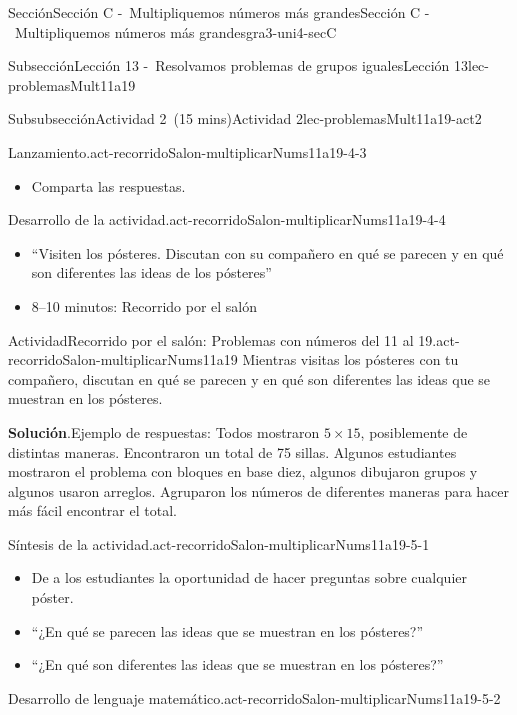 \documentclass[oneside,10pt,]{article}
\newcommand{\blocktitlefont}{\relax}
\begin{document}
\begin{sectionptx}{Sección}{Sección C -~Multipliquemos números más grandes}{}{Sección C -~Multipliquemos números más grandes}{}{}{gra3-uni4-secC}
\begin{subsectionptx}{Subsección}{Lección 13 -~Resolvamos problemas de grupos iguales}{}{Lección 13}{}{}{lec-problemasMult11a19}
\begin{subsubsectionptx}{Subsubsección}{Actividad 2~(15 mins)}{}{Actividad 2}{}{}{lec-problemasMult11a19-act2}
\begin{paragraphs}{Lanzamiento.}{act-recorridoSalon-multiplicarNums11a19-4-3}
\begin{itemize}[label=\textbullet]
\item{}Comparta las respuestas.%
\end{itemize}
\end{paragraphs}%
\begin{paragraphs}{Desarrollo de la actividad.}{act-recorridoSalon-multiplicarNums11a19-4-4}%
%
\begin{itemize}[label=\textbullet]
\item{}``Visiten los pósteres. Discutan con su compañero en qué se parecen y en qué son diferentes las ideas de los pósteres''%
\item{}8–10 minutos: Recorrido por el salón%
\end{itemize}
\end{paragraphs}%
\begin{activity}{Actividad}{Recorrido por el salón: Problemas con números del 11 al 19.}{act-recorridoSalon-multiplicarNums11a19}%
Mientras visitas los pósteres con tu compañero, discutan en qué se parecen y en qué son diferentes las ideas que se muestran en los pósteres.%
\par\smallskip%
\noindent\textbf{\blocktitlefont Solución}.\hypertarget{act-recorridoSalon-multiplicarNums11a19-3}{}\quad{}Ejemplo de respuestas: Todos mostraron \(5 \times 15\), posiblemente de distintas maneras. Encontraron un total de 75 sillas. Algunos estudiantes mostraron el problema con bloques en base diez, algunos dibujaron grupos y algunos usaron arreglos. Agruparon los números de diferentes maneras para hacer más fácil encontrar el total.%
\end{activity}%
\par
\begin{paragraphs}{Síntesis de la actividad.}{act-recorridoSalon-multiplicarNums11a19-5-1}%
%
\begin{itemize}[label=\textbullet]
\item{}De a los estudiantes la oportunidad de hacer preguntas sobre cualquier póster.%
\item{}``¿En qué se parecen las ideas que se muestran en los pósteres?''%
\item{}``¿En qué son diferentes las ideas que se muestran en los pósteres?''%
\end{itemize}
\end{paragraphs}%
\begin{paragraphs}{Desarrollo de lenguaje matemático.}{act-recorridoSalon-multiplicarNums11a19-5-2}%

\end{paragraphs}
\end{subsubsectionptx}
\end{subsectionptx}
\end{sectionptx}
\end{document}
